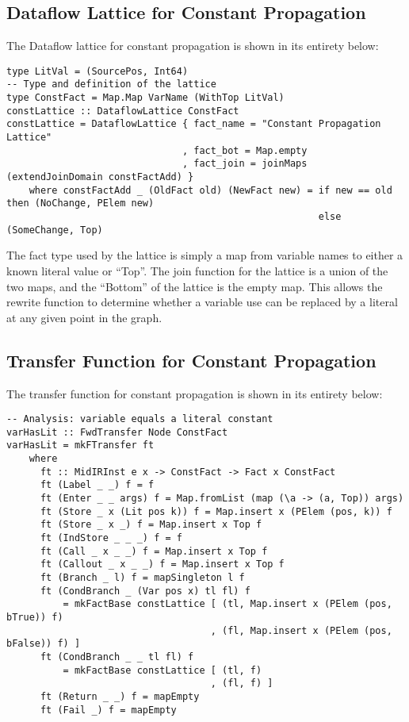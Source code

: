 \documentclass[11pt]{article}
\begin{document}
\subsection { Dataflow Lattice for Constant Propagation } 

The Dataflow lattice for constant propagation is shown in its entirety below:

{\small\begin{verbatim}
type LitVal = (SourcePos, Int64)
-- Type and definition of the lattice
type ConstFact = Map.Map VarName (WithTop LitVal)
constLattice :: DataflowLattice ConstFact
constLattice = DataflowLattice { fact_name = "Constant Propagation Lattice"
                               , fact_bot = Map.empty 
                               , fact_join = joinMaps (extendJoinDomain constFactAdd) }
    where constFactAdd _ (OldFact old) (NewFact new) = if new == old then (NoChange, PElem new)
                                                       else (SomeChange, Top)
\end{verbatim}}

The fact type used by the lattice is simply a map from variable names to either a known literal value or ``Top''. The join function for the lattice is a union of the two maps, and the ``Bottom'' of the lattice is the empty map. This allows the rewrite function to determine whether a variable use can be replaced by a literal at any given point in the graph.  

\subsection { Transfer Function for Constant Propagation }

The transfer function for constant propagation is shown in its entirety below: 

\begin{verbatim}
-- Analysis: variable equals a literal constant
varHasLit :: FwdTransfer Node ConstFact
varHasLit = mkFTransfer ft
    where
      ft :: MidIRInst e x -> ConstFact -> Fact x ConstFact
      ft (Label _ _) f = f
      ft (Enter _ _ args) f = Map.fromList (map (\a -> (a, Top)) args)
      ft (Store _ x (Lit pos k)) f = Map.insert x (PElem (pos, k)) f
      ft (Store _ x _) f = Map.insert x Top f
      ft (IndStore _ _ _) f = f
      ft (Call _ x _ _) f = Map.insert x Top f
      ft (Callout _ x _ _) f = Map.insert x Top f 
      ft (Branch _ l) f = mapSingleton l f
      ft (CondBranch _ (Var pos x) tl fl) f 
          = mkFactBase constLattice [ (tl, Map.insert x (PElem (pos, bTrue)) f)
                                    , (fl, Map.insert x (PElem (pos, bFalse)) f) ]
      ft (CondBranch _ _ tl fl) f 
          = mkFactBase constLattice [ (tl, f)
                                    , (fl, f) ]
      ft (Return _ _) f = mapEmpty
      ft (Fail _) f = mapEmpty

\end{verbatim}
\end{document}
